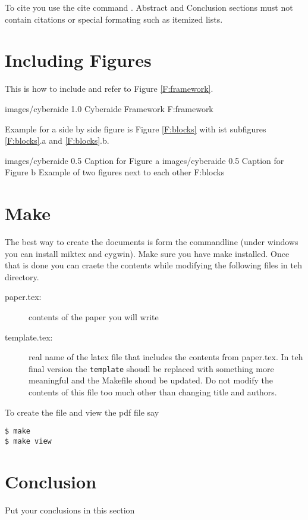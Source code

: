 To cite you use the cite command \cite{las99loosely}. Abstract and Conclusion sections must not contain citations or special formating such as itemized lists.

\section{Including Figures}

This is how to include and refer to Figure \ref{F:framework}.
 

  {images/cyberaide}
  {1.0}
  {Cyberaide Framework}
  {F:framework}

Example for a side by side figure is Figure  \ref{F:blocks} with ist subfigures 
\ref{F:blocks}.a and \ref{F:blocks}.b.

  {images/cyberaide}
  {0.5}
  {Caption for Figure a}
  {images/cyberaide}
  {0.5}
  {Caption for Figure b}
  {Example of two figures next to each other}
  {F:blocks}


\section{Make}

The best way to create the documents is form the commandline (under windows you can install miktex and cygwin). Make sure you have make installed. Once that is done you can craete the contents while modifying the following files in teh directory.

\begin{description}

\item[paper.tex:] contents of the paper you will write
\item[template.tex:] real name of the latex file that includes the contents from paper.tex. In teh final version the \verb|template| shoudl be replaced with something more meaningful and the Makefile shoud be updated. Do not modify the contents of this file too much other than changing title and authors. 

\end{description}

To create the file and view the pdf file say

\begin{verbatim}
$ make
$ make view
\end{verbatim}


\section{Conclusion}

Put your conclusions in this section
